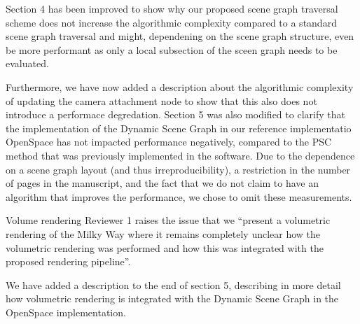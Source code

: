 \documentclass{article}
\begin{document}
Section 4 has been improved to show why our proposed scene graph traversal scheme does not increase the algorithmic complexity compared to a standard scene graph traversal and might, dependening on the scene graph structure, even be more performant as only a local subsection of the sceen graph needs to be evaluated.

Furthermore, we have now added a description about the algorithmic complexity of updating the camera attachment node to show that this also does not introduce a performace degredation.
Section 5 was also modified to clarify that the implementation of the Dynamic Scene Graph in our reference implementatio OpenSpace has not impacted performance negatively, compared to the PSC method that was previously implemented in the software.
Due to the dependence on a scene graph layout (and thus irreproducibility), a restriction in the number of pages in the manuscript, and the fact that we do not claim to have an algorithm that improves the performance, we chose to omit these measurements.

\vspace*{1cm}

\begin{tcolorbox}
{\large Volume rendering} Reviewer 1 raises the issue that we ``present a volumetric rendering of the Milky Way where it remains completely unclear how the volumetric rendering was performed and how this was integrated with the proposed rendering pipeline''.
\end{tcolorbox}
We have added a description to the end of section 5, describing in more detail how volumetric rendering is integrated with the Dynamic Scene Graph in the OpenSpace implementation.



%
%
%
%
%
\end{document}
